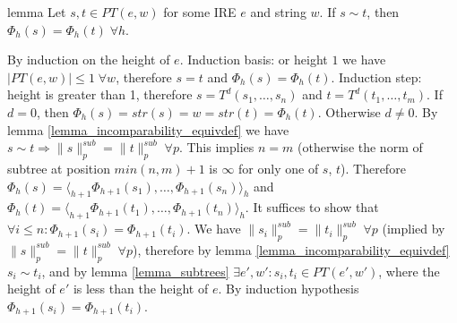\documentclass[AMA,STIX1COL]{WileyNJD-v2}
\newcommand{\Xl}{\langle}
\newcommand{\Xr}{\rangle}
\newcommand{\PT}{PT}
\newcommand{\snorm}[2]{\|{#1}\|^{sub}_{#2}}
\begin{document}
\begin{theoremEnd}{lemma}
    \label{lemma_pe_equiv}
    Let $s, t \in \PT(e, w)$ for some IRE $e$ and string $w$.
    If $s \sim t$, then $\Phi_{h}(s) = \Phi_{h}(t) \; \forall h$.
\end{theoremEnd}
\begin{proofEnd}
    By induction on the height of $e$.
    Induction basis: or height $1$ we have
    $| \PT(e, w) | \leq 1 \; \forall w$,
    therefore $s = t$ and $\Phi_{h}(s) = \Phi_{h}(t)$.
    Induction step:
    height is greater than 1, therefore
    $s = T^{d} (s_1, \dots, s_n)$ and
    $t = T^{d} (t_1, \dots, t_m)$.
    If $d = 0$, then $\Phi_{h}(s) = str(s) = w = str(t) = \Phi_{h}(t)$.
    Otherwise $d \neq 0$.
    By lemma \ref{lemma_incomparability_equivdef} we have $s \sim t \Rightarrow \snorm{s}{p} = \snorm{t}{p} \;\forall p$.
    This implies $n = m$ (otherwise the norm of subtree at position $min(n,m)+1$ is $\infty$ for only one of $s$, $t$).
    Therefore
    $\Phi_{h}(s) = \Xl_{h+1} \Phi_{h+1}(s_1), \dots, \Phi_{h+1}(s_n) \Xr_h$ and
    $\Phi_{h}(t) = \Xl_{h+1} \Phi_{h+1}(t_1), \dots, \Phi_{h+1}(t_n) \Xr_h$.
    It suffices to show that $\forall i \leq n: \Phi_{h+1}(s_i) = \Phi_{h+1}(t_i)$.
    We have $\snorm{s_i}{p} = \snorm{t_i}{p} \;\forall p$ (implied by $\snorm{s}{p} = \snorm{t}{p} \;\forall p$),
    therefore by lemma \ref{lemma_incomparability_equivdef} $s_i \sim t_i$,
    and by lemma \ref{lemma_subtrees} $\exists e', w': s_i, t_i \in \PT(e', w')$,
    where the height of $e'$ is less than the height of $e$.
    By induction hypothesis $\Phi_{h+1}(s_i) = \Phi_{h+1}(t_i)$.
\end{proofEnd}
\end{document}
